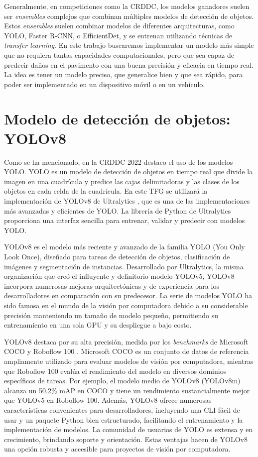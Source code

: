 Generalmente, en competiciones como la CRDDC, los modelos ganadores suelen ser \textit{ensembles} complejos que combinan múltiples modelos de detección de objetos. Estos \textit{ensembles} suelen combinar modelos de diferentes arquitecturas, como YOLO, Faster R-CNN, o EfficientDet, y se entrenan utilizando técnicas de \textit{transfer learning}. En este trabajo buscaremos implementar un modelo más simple que no requiera tantas capacidades computacionales, pero que sea capaz de predecir daños en el pavimento con una buena precisión y eficacia en tiempo real. La idea es tener un modelo preciso, que generalice bien y que sea rápido, para poder ser implementado en un dispositivo móvil o en un vehículo.


\section{Modelo de detección de objetos: YOLOv8}
Como se ha mencionado, en la CRDDC 2022 destaco el uso de los modelos YOLO. YOLO \cite{YOLO} es un modelo de detección de objetos en tiempo real que divide la imagen en una cuadrícula y predice las cajas delimitadoras y las clases de los objetos en cada celda de la cuadrícula. En este TFG se utilizará la implementación de YOLOv8 de Ultralytics \cite{yolov8_ultralytics}, que es una de las implementaciones más avanzadas y eficientes de YOLO. La librería de Python de Ultralytics proporciona una interfaz sencilla para entrenar, validar y predecir con modelos YOLO.

YOLOv8 es el modelo más reciente y avanzado de la familia YOLO (You Only Look Once), diseñado para tareas de detección de objetos, clasificación de imágenes y segmentación de instancias. Desarrollado por Ultralytics, la misma organización que creó el influyente y definitorio modelo YOLOv5, YOLOv8 incorpora numerosas mejoras arquitectónicas y de experiencia para los desarrolladores en comparación con su predecesor. La serie de modelos YOLO ha sido famosa en el mundo de la visión por computadora debido a su considerable precisión manteniendo un tamaño de modelo pequeño, permitiendo su entrenamiento en una sola GPU y su despliegue a bajo costo.

YOLOv8 destaca por su alta precisión, medida por los \textit{benchmarks} de Microsoft COCO \cite{COCO} y Roboflow 100 \cite{Roboflow100}. Microsoft COCO es un conjunto de datos de referencia ampliamente utilizado para evaluar modelos de visión por computadora, mientras que Roboflow 100 evalúa el rendimiento del modelo en diversos dominios específicos de tareas. Por ejemplo, el modelo medio de YOLOv8 (YOLOv8m) alcanza un 50.2\% mAP en COCO y tiene un rendimiento sustancialmente mejor que YOLOv5 en Roboflow 100. Además, YOLOv8 ofrece numerosas características convenientes para desarrolladores, incluyendo una CLI fácil de usar y un paquete Python bien estructurado, facilitando el entrenamiento y la implementación de modelos. La comunidad de usuarios de YOLO es extensa y en crecimiento, brindando soporte y orientación. Estas ventajas hacen de YOLOv8 una opción robusta y accesible para proyectos de visión por computadora.

